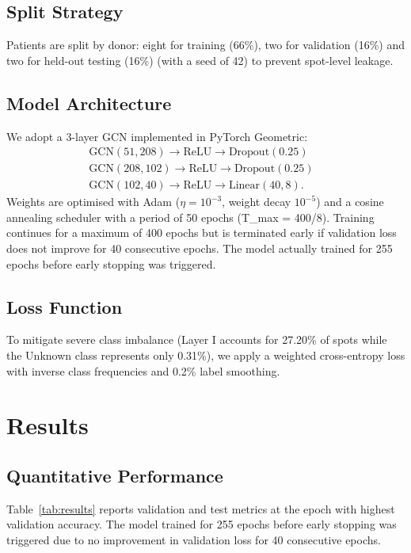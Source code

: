 \documentclass[conference]{IEEEtran}
\begin{document}
\subsection{Split Strategy}
Patients are split by donor: eight for training (66\%), two for validation (16\%)
and two for held-out testing (16\%) (with a seed of 42) to prevent spot-level
leakage.

\subsection{Model Architecture}
We adopt a 3-layer GCN implemented in PyTorch Geometric:
\begin{align*}
\text{GCN}(51,208) \rightarrow \text{ReLU} \rightarrow \text{Dropout}(0.25) &\\
\text{GCN}(208,102) \rightarrow \text{ReLU} \rightarrow \text{Dropout}(0.25) &\\
\text{GCN}(102,40)  \rightarrow \text{ReLU} \rightarrow \text{Linear}(40,8).
\end{align*}
Weights are optimised with Adam (\(\eta{=}10^{-3}\), weight decay \(10^{-5}\)) 
and a cosine annealing scheduler with a period of 50 epochs (T\_max = 400/8). 
Training continues for a maximum of 400 epochs but is terminated early if 
validation loss does not improve for 40 consecutive epochs. The model actually 
trained for 255 epochs before early stopping was triggered.

\subsection{Loss Function}
To mitigate severe class imbalance (Layer I accounts for 27.20\% of spots while 
the Unknown class represents only 0.31\%), we apply a weighted cross-entropy 
loss with inverse class frequencies and 0.2\% label smoothing.

\section{Results}
\subsection{Quantitative Performance}
Table~\ref{tab:results} reports validation and test metrics at the epoch with 
highest validation accuracy. The model trained for 255 epochs before early 
stopping was triggered due to no improvement in validation loss for 40 
consecutive epochs.
\end{document}
